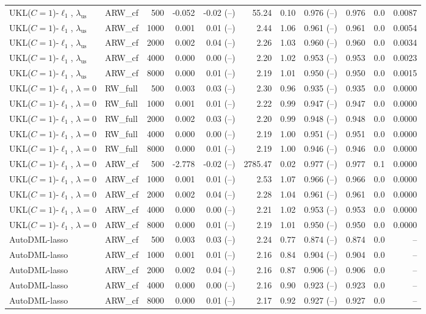 \begin{tabular}{llrrrrrrrrr}
UKL($C=1$)-$\ell_1$, $\lambda_{\mathrm{us}}$ & ARW\_cf & 500 & -0.052 & -0.02 (--) & 55.24 & 0.10 & 0.976 (--) & 0.976 & 0.0 & 0.0087 \\
UKL($C=1$)-$\ell_1$, $\lambda_{\mathrm{us}}$ & ARW\_cf & 1000 & 0.001 & 0.01 (--) & 2.44 & 1.06 & 0.961 (--) & 0.961 & 0.0 & 0.0054 \\
UKL($C=1$)-$\ell_1$, $\lambda_{\mathrm{us}}$ & ARW\_cf & 2000 & 0.002 & 0.04 (--) & 2.26 & 1.03 & 0.960 (--) & 0.960 & 0.0 & 0.0034 \\
UKL($C=1$)-$\ell_1$, $\lambda_{\mathrm{us}}$ & ARW\_cf & 4000 & 0.000 & 0.00 (--) & 2.20 & 1.02 & 0.953 (--) & 0.953 & 0.0 & 0.0023 \\
UKL($C=1$)-$\ell_1$, $\lambda_{\mathrm{us}}$ & ARW\_cf & 8000 & 0.000 & 0.01 (--) & 2.19 & 1.01 & 0.950 (--) & 0.950 & 0.0 & 0.0015 \\
UKL($C=1$)-$\ell_1$, $\lambda=0$ & RW\_full & 500 & 0.003 & 0.03 (--) & 2.30 & 0.96 & 0.935 (--) & 0.935 & 0.0 & 0.0000 \\
UKL($C=1$)-$\ell_1$, $\lambda=0$ & RW\_full & 1000 & 0.001 & 0.01 (--) & 2.22 & 0.99 & 0.947 (--) & 0.947 & 0.0 & 0.0000 \\
UKL($C=1$)-$\ell_1$, $\lambda=0$ & RW\_full & 2000 & 0.002 & 0.03 (--) & 2.20 & 0.99 & 0.948 (--) & 0.948 & 0.0 & 0.0000 \\
UKL($C=1$)-$\ell_1$, $\lambda=0$ & RW\_full & 4000 & 0.000 & 0.00 (--) & 2.19 & 1.00 & 0.951 (--) & 0.951 & 0.0 & 0.0000 \\
UKL($C=1$)-$\ell_1$, $\lambda=0$ & RW\_full & 8000 & 0.000 & 0.01 (--) & 2.19 & 1.00 & 0.946 (--) & 0.946 & 0.0 & 0.0000 \\
UKL($C=1$)-$\ell_1$, $\lambda=0$ & ARW\_cf & 500 & -2.778 & -0.02 (--) & 2785.47 & 0.02 & 0.977 (--) & 0.977 & 0.1 & 0.0000 \\
UKL($C=1$)-$\ell_1$, $\lambda=0$ & ARW\_cf & 1000 & 0.001 & 0.01 (--) & 2.53 & 1.07 & 0.966 (--) & 0.966 & 0.0 & 0.0000 \\
UKL($C=1$)-$\ell_1$, $\lambda=0$ & ARW\_cf & 2000 & 0.002 & 0.04 (--) & 2.28 & 1.04 & 0.961 (--) & 0.961 & 0.0 & 0.0000 \\
UKL($C=1$)-$\ell_1$, $\lambda=0$ & ARW\_cf & 4000 & 0.000 & 0.00 (--) & 2.21 & 1.02 & 0.953 (--) & 0.953 & 0.0 & 0.0000 \\
UKL($C=1$)-$\ell_1$, $\lambda=0$ & ARW\_cf & 8000 & 0.000 & 0.01 (--) & 2.19 & 1.01 & 0.950 (--) & 0.950 & 0.0 & 0.0000 \\
AutoDML-lasso & ARW\_cf & 500 & 0.003 & 0.03 (--) & 2.24 & 0.77 & 0.874 (--) & 0.874 & 0.0 & -- \\
AutoDML-lasso & ARW\_cf & 1000 & 0.001 & 0.01 (--) & 2.16 & 0.84 & 0.904 (--) & 0.904 & 0.0 & -- \\
AutoDML-lasso & ARW\_cf & 2000 & 0.002 & 0.04 (--) & 2.16 & 0.87 & 0.906 (--) & 0.906 & 0.0 & -- \\
AutoDML-lasso & ARW\_cf & 4000 & 0.000 & 0.00 (--) & 2.16 & 0.90 & 0.923 (--) & 0.923 & 0.0 & -- \\
AutoDML-lasso & ARW\_cf & 8000 & 0.000 & 0.01 (--) & 2.17 & 0.92 & 0.927 (--) & 0.927 & 0.0 & -- \\
\hline
\end{tabular}
